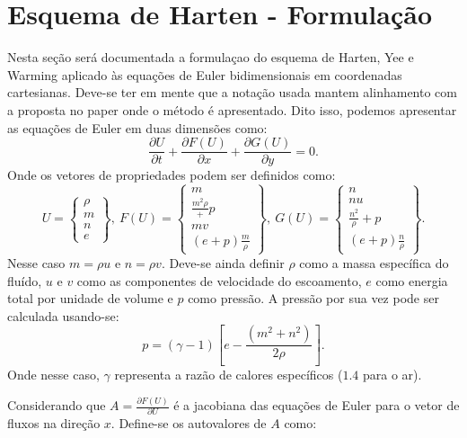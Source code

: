 \documentclass[a4paper, twoside, 12pt]{article}
\numberwithin{equation}{section}
\begin{document}
\section{Esquema de Harten - Formulação}
Nesta seção será documentada a formulaçao do esquema de Harten, Yee e Warming \cite{YEE_JCP_1985} aplicado às equações de Euler bidimensionais em coordenadas cartesianas. Deve-se ter em mente que a notação usada mantem alinhamento com a proposta no paper \cite{YEE_NASATM_1983} onde o método é apresentado. Dito isso, podemos apresentar as equações de Euler em duas dimensões como:
\begin{equation}
\frac{\partial U}{\partial t}+\frac{\partial F(U)}{\partial x}+\frac{\partial G(U)}{\partial y}=0.
\end{equation}
Onde os vetores de propriedades podem ser definidos como:
\begin{equation}
U=\begin{Bmatrix} \rho \\  m\\ n\\ e \end{Bmatrix},\:F(U)=\begin{Bmatrix} m\\ \frac{m^{2}{\rho}}+p\\ mv\\ (e+p)\frac{m}{\rho} \end{Bmatrix}, \: G(U)=\begin{Bmatrix}
n\\ 
nu\\ 
\frac{n^{2}}{\rho}+p\\ 
(e+p)\frac{n}{\rho}
\end{Bmatrix}.
\end{equation}
Nesse caso $m=\rho u$ e $n=\rho v$. Deve-se ainda definir $\rho$ como a massa específica do fluído, $u$ e $v$ como as componentes de velocidade do escoamento, $e$ como energia total por unidade de volume e $p$ como pressão. A pressão por sua vez pode ser calculada usando-se:
\begin{equation}
p=(\gamma-1)\left [ e-\frac{(m^{2}+n^{2})}{2\rho} \right ].
\end{equation}
Onde nesse caso, $\gamma$ representa a razão de calores específicos ($1.4$ para o ar).

Considerando que $A=\frac{\partial F(U)}{\partial U}$ é a jacobiana das equações de Euler para o vetor de fluxos na direção $x$. Define-se os autovalores de $A$ como:
\end{document}
